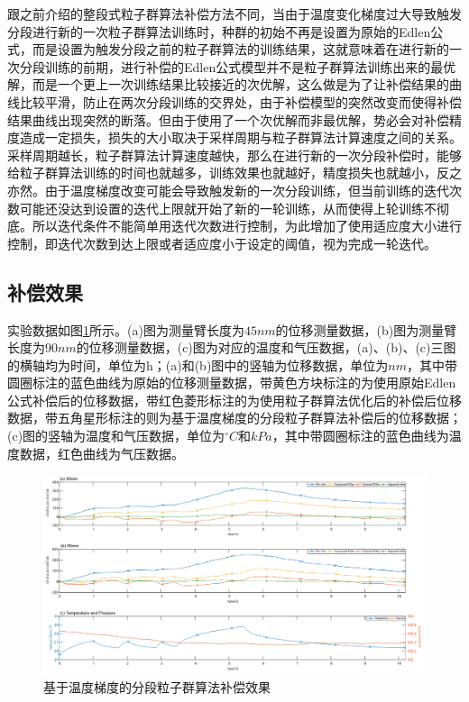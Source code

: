跟之前介绍的整段式粒子群算法补偿方法不同，当由于温度变化梯度过大导致触发分段进行新的一次粒子群算法训练时，种群的初始不再是设置为原始的Edlen公式，而是设置为触发分段之前的粒子群算法的训练结果，这就意味着在进行新的一次分段训练的前期，进行补偿的Edlen公式模型并不是粒子群算法训练出来的最优解，而是一个更上一次训练结果比较接近的次优解，这么做是为了让补偿结果的曲线比较平滑，防止在两次分段训练的交界处，由于补偿模型的突然改变而使得补偿结果曲线出现突然的断落。但由于使用了一个次优解而非最优解，势必会对补偿精度造成一定损失，损失的大小取决于采样周期与粒子群算法计算速度之间的关系。采样周期越长，粒子群算法计算速度越快，那么在进行新的一次分段补偿时，能够给粒子群算法训练的时间也就越多，训练效果也就越好，精度损失也就越小，反之亦然。由于温度梯度改变可能会导致触发新的一次分段训练，但当前训练的迭代次数可能还没达到设置的迭代上限就开始了新的一轮训练，从而使得上轮训练不彻底。所以迭代条件不能简单用迭代次数进行控制，为此增加了使用适应度大小进行控制，即迭代次数到达上限或者适应度小于设定的阈值，视为完成一轮迭代。

\subsection{补偿效果}
实验数据如图\ref{fig:基于温度梯度的分段粒子群算法补偿效果}所示。(a)图为测量臂长度为$45nm$的位移测量数据，(b)图为测量臂长度为$90nm$的位移测量数据，(c)图为对应的温度和气压数据，(a)、(b)、(c)三图的横轴均为时间，单位为h；(a)和(b)图中的竖轴为位移数据，单位为$nm$，其中带圆圈标注的蓝色曲线为原始的位移测量数据，带黄色方块标注的为使用原始Edlen公式补偿后的位移数据，带红色菱形标注的为使用粒子群算法优化后的补偿后位移数据，带五角星形标注的则为基于温度梯度的分段粒子群算法补偿后的位移数据；(c)图的竖轴为温度和气压数据，单位为$^{\circ}C$和$kPa$，其中带圆圈标注的蓝色曲线为温度数据，红色曲线为气压数据。

\begin{figure}[htb]
  \centering
  \includegraphics[width=14cm]{fig/4-fig/基于温度梯度的分段粒子群算法补偿效果.jpg}
  \caption{基于温度梯度的分段粒子群算法补偿效果}
  \label{fig:基于温度梯度的分段粒子群算法补偿效果}
\end{figure}

